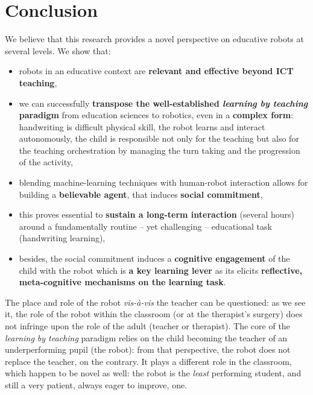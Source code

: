 \documentclass{article}
\begin{document}
\section{Conclusion}

We believe that this research provides a novel perspective on educative
robots at several levels. We show that:

\begin{itemize}
    \item robots in an educative context are \textbf{relevant and effective beyond ICT
        teaching},

    \item we can successfully \textbf{transpose the well-established
        \emph{learning by teaching} paradigm} from education sciences to
        robotics, even in a \textbf{complex form}: handwriting is difficult
        physical skill, the robot learns and interact autonomously, the child is
        responsible not only for the teaching but also for the teaching
        orchestration by managing the turn taking and the progression of the
        activity,

    \item blending machine-learning techniques with human-robot interaction
        allows for building a \textbf{believable agent}, that induces
        \textbf{social commitment},

    \item this proves essential to \textbf{sustain a long-term interaction} (several
        hours) around a fundamentally routine -- yet challenging -- educational
        task (handwriting learning),

    \item besides, the social commitment induces a \textbf{cognitive engagement}
        of the child with the robot which is \textbf{a key learning lever} as
        its elicits \textbf{reflective, meta-cognitive mechanisms on the
        learning task}.
\end{itemize}


The place and role of the robot \textit{vis-\`a-vis} the teacher can be
questioned: as we see it, the role of the robot within the classroom (or at the
therapist's surgery) does not infringe upon the role of the adult (teacher or
therapist).  The core of the \emph{learning by teaching} paradigm relies on the
child becoming the teacher of an underperforming pupil (the robot): from that
perspective, the robot does not replace the teacher, on the contrary. It plays a
different role in the classroom, which happen to be novel as well: the robot is
the \emph{least} performing student, and still a very patient, always eager to
improve, one.
\end{document}
